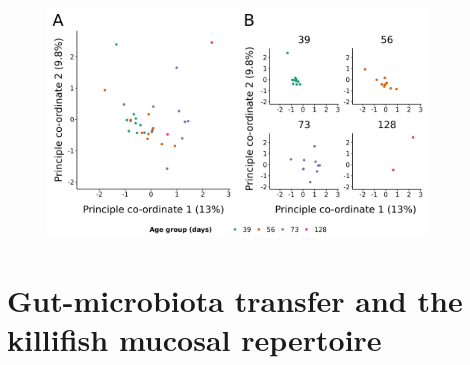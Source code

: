 \begin{figure}
\centering
\includegraphics[width = 0.9\textwidth]{_Figures/png/ageing-rdi-VJ-individual-pcoa}
\begin{subfigure}{0em}
\label{fig:igseq-ageing-rdi-VJ-individual-pcoa-all}
\end{subfigure}
\begin{subfigure}{0em}
\label{fig:igseq-ageing-rdi-VJ-individual-pcoa-facet}
\end{subfigure}
\label{fig:igseq-ageing-rdi-VJ-individual-pcoa}
\end{figure}

\FloatBarrier
\clearpage

\section{Gut-microbiota transfer and the killifish mucosal repertoire}
\label{sec:igseq_gut}

